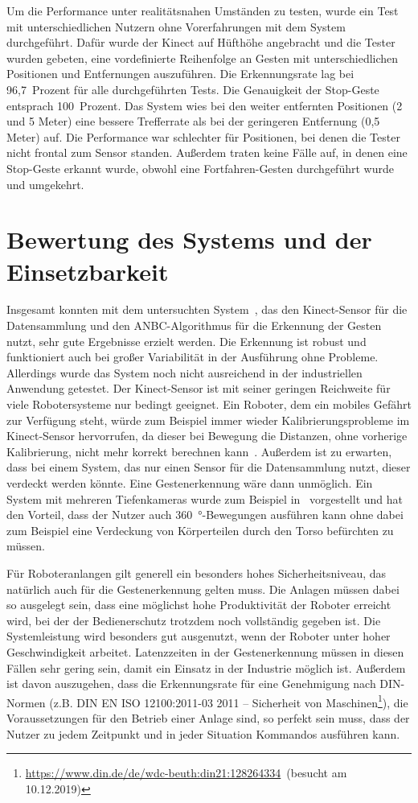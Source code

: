 Um die Performance unter realitätsnahen Umständen zu testen, wurde ein Test mit unterschiedlichen Nutzern ohne Vorerfahrungen mit dem System durchgeführt. Dafür wurde der Kinect auf Hüfthöhe angebracht und die Tester wurden gebeten, eine vordefinierte Reihenfolge an Gesten mit unterschiedlichen Positionen und Entfernungen auszuführen. Die Erkennungsrate lag bei 96,7~Prozent für alle durchgeführten Tests. Die Genauigkeit der Stop-Geste entsprach 100~Prozent. Das System wies bei den weiter entfernten Positionen (2 und 5 Meter) eine bessere Trefferrate als bei der geringeren Entfernung (0,5 Meter) auf. Die Performance war schlechter für Positionen, bei denen die Tester nicht frontal zum Sensor standen. Außerdem traten keine Fälle auf, in denen eine Stop-Geste erkannt wurde, obwohl eine Fortfahren-Gesten durchgeführt wurde und umgekehrt.~\cite{flexibleSystem}

\section{Bewertung des Systems und der Einsetzbarkeit}
Insgesamt konnten mit dem untersuchten System~\cite{flexibleSystem}, das den Kinect-Sensor für die Datensammlung und den ANBC-Algorithmus für die Erkennung der Gesten nutzt, sehr gute Ergebnisse erzielt werden. Die Erkennung ist robust und funktioniert auch bei großer Variabilität in der Ausführung ohne Probleme. Allerdings wurde das System noch nicht ausreichend in der industriellen Anwendung getestet. Der Kinect-Sensor ist mit seiner geringen Reichweite für viele Robotersysteme nur bedingt geeignet. Ein Roboter, dem ein mobiles Gefährt zur Verfügung steht, würde zum Beispiel immer wieder Kalibrierungsprobleme im Kinect-Sensor hervorrufen, da dieser bei Bewegung die Distanzen, ohne vorherige Kalibrierung, nicht mehr korrekt berechnen kann~\cite{cruzkinect}. Außerdem ist zu erwarten, dass bei einem System, das nur einen Sensor für die Datensammlung nutzt, dieser verdeckt werden könnte. Eine Gestenerkennung wäre dann unmöglich. Ein System mit mehreren Tiefenkameras wurde zum Beispiel in~\cite{multipleDepthCameras} vorgestellt und hat den Vorteil, dass der Nutzer auch \SI{360}{\degree}-Bewegungen ausführen kann ohne dabei zum Beispiel eine Verdeckung von Körperteilen durch den Torso befürchten zu müssen.

Für Roboteranlangen gilt generell ein besonders hohes Sicherheitsniveau, das natürlich auch für die Gestenerkennung gelten muss. Die Anlagen müssen dabei so ausgelegt sein, dass eine möglichst hohe Produktivität der Roboter erreicht wird, bei der der Bedienerschutz trotzdem noch vollständig gegeben ist. Die Systemleistung wird besonders gut ausgenutzt, wenn der Roboter unter hoher Geschwindigkeit arbeitet. Latenzzeiten in der Gestenerkennung müssen in diesen Fällen sehr gering sein, damit ein Einsatz in der Industrie möglich ist. Außerdem ist davon auszugehen, dass die Erkennungsrate für eine Genehmigung nach DIN-Normen (z.B. DIN EN ISO 12100:2011-03 2011 -- Sicherheit von Maschinen\footnote{\url{https://www.din.de/de/wdc-beuth:din21:128264334}~(besucht am 10.12.2019)}), die Voraussetzungen für den Betrieb einer Anlage sind, so perfekt sein muss, dass der Nutzer zu jedem Zeitpunkt und in jeder Situation Kommandos ausführen kann.~\cite{ObererTreitz.2019}
